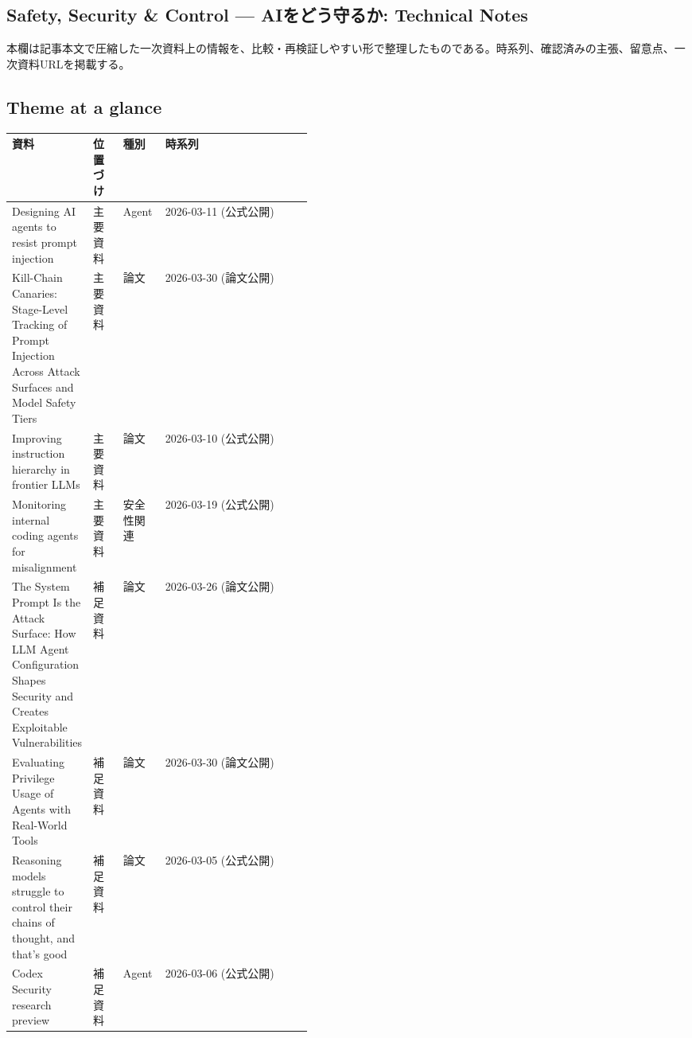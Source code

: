 \subsection*{Safety, Security \& Control — AIをどう守るか: Technical Notes}
本欄は記事本文で圧縮した一次資料上の情報を、比較・再検証しやすい形で整理したものである。時系列、確認済みの主張、留意点、一次資料URLを掲載する。
\medskip
\subsection*{Theme at a glance}
\begin{center}
\footnotesize
\begin{tabularx}{\linewidth}{@{}p{0.20\linewidth}p{0.10\linewidth}p{0.14\linewidth}X@{}}
\toprule
資料 & 位置づけ & 種別 & 時系列 \\
\midrule
Designing AI agents to resist prompt injection & 主要資料 & Agent & 2026-03-11 (公式公開) \\
Kill-Chain Canaries: Stage-Level Tracking of Prompt Injection Across Attack Surfaces and Model Safety Tiers & 主要資料 & 論文 & 2026-03-30 (論文公開) \\
Improving instruction hierarchy in frontier LLMs & 主要資料 & 論文 & 2026-03-10 (公式公開) \\
Monitoring internal coding agents for misalignment & 主要資料 & 安全性関連 & 2026-03-19 (公式公開) \\
The System Prompt Is the Attack Surface: How LLM Agent Configuration Shapes Security and Creates Exploitable Vulnerabilities & 補足資料 & 論文 & 2026-03-26 (論文公開) \\
Evaluating Privilege Usage of Agents with Real-World Tools & 補足資料 & 論文 & 2026-03-30 (論文公開) \\
Reasoning models struggle to control their chains of thought, and that’s good & 補足資料 & 論文 & 2026-03-05 (公式公開) \\
Codex Security research preview & 補足資料 & Agent & 2026-03-06 (公式公開) \\
\bottomrule
\end{tabularx}
\end{center}
\normalsize

